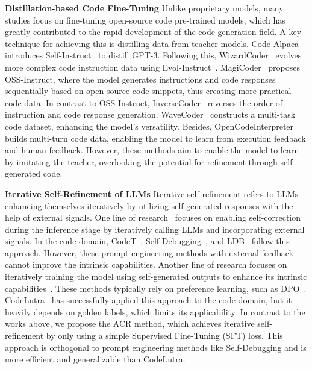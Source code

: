 \textbf{Distillation-based Code Fine-Tuning} 
Unlike proprietary models, many studies focus on fine-tuning open-source code pre-trained models, which has greatly contributed to the rapid development of the code generation field. A key technique for achieving this is distilling data from teacher models. Code Alpaca~\cite{codealpaca} introduces Self-Instruct~\cite{wang-etal-2023-self-instruct} to distill GPT-3. Following this, WizardCoder~\cite{luo2024wizardcoder} evolves more complex code instruction data using Evol-Instruct~\cite{xu2024wizardlm}. MagiCoder~\cite{wei2024magicoder} proposes OSS-Instruct, where the model generates instructions and code responses sequentially based on open-source code snippets, thus creating more practical code data. In contrast to OSS-Instruct, InverseCoder~\cite{wu2024inversecoders} reverses the order of instruction and code response generation. WaveCoder~\cite{yu-etal-2024-wavecoder} constructs a multi-task code dataset, enhancing the model's versatility. Besides, OpenCodeInterpreter~\cite{zheng-etal-2024-opencodeinterpreter} builds multi-turn code data, enabling the model to learn from execution feedback and human feedback. However, these methods aim to enable the model to learn by imitating the teacher, overlooking the potential for refinement through self-generated code.




\textbf{Iterative Self-Refinement of LLMs} 
Iterative self-refinement refers to LLMs enhancing themselves iteratively by utilizing self-generated responses with the help of external signals. 
One line of research~\cite{huang-etal-2023-large,madaan2023selfrefine,hu-etal-2024-teaching} focuses on enabling self-correction during the inference stage by iteratively calling LLMs and incorporating external signals. In the code domain, CodeT~\cite{chen2023codet}, Self-Debugging~\cite{chen2024teaching}, and LDB~\cite{zhong-etal-2024-debug} follow this approach. However, these prompt engineering methods with external feedback cannot improve the intrinsic capabilities. Another line of research focuses on iteratively training the model using self-generated outputs to enhance its intrinsic capabilities~\cite{dong2024self,yuan2024selfrewarding,kim2025spread}. These methods typically rely on preference learning, such as DPO~\cite{rafailov2023direct}. CodeLutra~\cite{tao2024codelutra} has successfully applied this approach to the code domain, but it heavily depends on golden labels, which limits its applicability. In contrast to the works above, we propose the ACR method, which achieves iterative self-refinement by only using a simple Supervised Fine-Tuning (SFT) loss. This approach is orthogonal to prompt engineering methods like Self-Debugging and is more efficient and generalizable than CodeLutra.